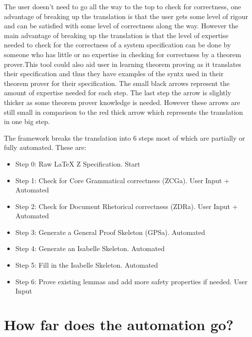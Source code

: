 The user doesn't need to go all the way to the top to check for correctness, one advantage of breaking up the translation is that the user gets some level of rigour and can be satisfied with some level of correctness along the way. However the main advantage of breaking up the translation is that the level of expertise needed to check for the correctness of a system specification can be done by someone who has little or no expertise in checking for correctness by a theorem prover.This tool could also aid user in learning theorem proving as it translates their specification and thus they have examples of the syntx used in their theorem prover for their specification. The small black arrows represent the amount of expertise needed for each step. The last step the arrow is slightly thicker as some theorem prover knowledge is needed. However these arrows are still small in comparison to the red thick arrow which represents the translation in one big step.

The framework breaks the translation into 6 steps most of which are partially or fully automated. These are:

\begin{itemize}
\item Step 0: Raw LaTeX Z Specification. {\color{set}Start}
\item Step 1: Check for Core Grammatical correctness (ZCGa). {\color{set}User Input + Automated}
\item Step 2: Check for Document Rhetorical correctness (ZDRa). {\color{set}User Input + Automated}
\item Step 3: Generate a General Proof Skeleton (GPSa). {\color{set}Automated}
\item Step 4: Generate an Isabelle Skeleton. {\color{set}Automated}
\item Step 5: Fill in the Isabelle Skeleton. {\color{set}Automated}
\item Step 6: Prove existing lemmas and add more safety properties if needed. {\color{set}User Input}
\end{itemize}

\section{How far does the automation go?}



